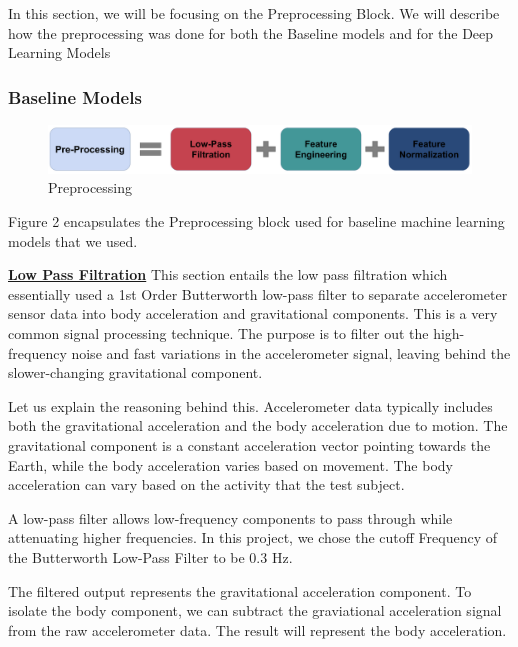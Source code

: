 \documentclass[conference]{IEEEtran}
\begin{document}
In this section, we will be focusing on the Preprocessing Block. We will describe how the preprocessing was done for both the Baseline models and for the Deep Learning Models  

\subsubsection{Baseline Models}

\begin{figure}[h!]
	\includegraphics[width= 0.9 \linewidth]{Preprocessing.png}
	\centering
	\caption{Preprocessing}
	\label{Preprocessing.png}
\end{figure}

Figure 2 encapsulates the Preprocessing block used for baseline machine learning models that we used.

\textbf{\underline{Low Pass Filtration}} \newline 
This section entails the low pass filtration which essentially used a 1st Order Butterworth low-pass filter to separate accelerometer sensor data into body acceleration and gravitational components. This is a very common signal processing technique. The purpose is to filter out the high-frequency noise and fast variations in the accelerometer signal, leaving behind the slower-changing gravitational component. \newline 

Let us explain the reasoning behind this. Accelerometer data typically includes both the gravitational acceleration and the body acceleration due to motion. The gravitational component is a constant acceleration vector pointing towards the Earth, while the body acceleration varies based on movement. The body acceleration can vary based on the activity that the test subject. \newline 

A low-pass filter allows low-frequency components to pass through while attenuating higher frequencies. In this project, we chose the cutoff Frequency of the Butterworth Low-Pass Filter to be 0.3 Hz. \newline 

The filtered output represents the gravitational acceleration component. To isolate the body component, we can subtract the graviational acceleration signal from the raw accelerometer data. The result will  represent the body acceleration. \newline 
\end{document}
